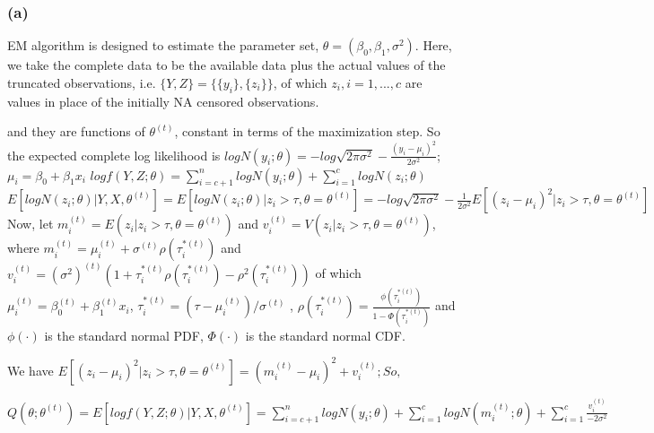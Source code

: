 \documentclass{article}\usepackage{graphicx, color}
\begin{document}
\subsubsection*{(a)}
\hspace{12 pt} EM algorithm is designed to estimate the parameter set, $\theta = (\beta_0,\beta_1,\sigma^2)$. Here, we take the complete data to be
the available data plus the actual values of the truncated observations, i.e. $\{Y, Z\}=\{\{y_i\},\{z_i\}\}$, 
of which $z_i, i=1, ... , c$ are values in place of the initially NA censored observations. 

and they are functions of $\theta^{(t)}$, constant in terms of the maximization step.  
So the expected complete log likelihood is \newline
$logN(y_i;\theta) = \displaystyle -log\sqrt{2\pi\sigma^2} - \frac{(y_i-\mu_i)^2}{2\sigma^2}$; $\mu_i = \beta_0 + \beta_1x_i$ \newline
$logf(Y,Z;\theta) = \displaystyle \sum_{i=c+1}^n logN(y_i;\theta) + \sum_{i=1}^c logN(z_i;\theta) $ \newline
$E[logN(z_i;\theta) | Y,X,\theta^{(t)}] = E[logN(z_i;\theta) | z_i>\tau,\theta = \theta^{(t)}] 
                        = \displaystyle -log\sqrt{2\pi\sigma^2}-\frac{1}{2\sigma^2}E[(z_i-\mu_i)^2  | z_i>\tau,\theta = \theta^{(t)}]$\newline
Now, let $\displaystyle m_i^{(t)}=E(z_i|z_i>\tau,\theta = \theta^{(t)})$ and $\displaystyle v_i^{(t)}=V(z_i|z_i>\tau,\theta = \theta^{(t)})$, \newline
where $\displaystyle m_i^{(t)} = \mu_i^{(t)} + \sigma^{(t)}\rho(\tau_i^{*(t)})$ 
and $\displaystyle v_i^{(t)} = (\sigma^2)^{(t)}(1 + \tau_i^{*(t)}\rho(\tau_i^{*(t)}) - \rho^2(\tau_i^{*(t)}))$ \newline
of which $\displaystyle \mu_i^{(t)} = \beta_0^{(t)} + \beta_1^{(t)}x_i$, $\displaystyle \tau_i^{*(t)} = (\tau - \mu_i^{(t)})/\sigma^{(t)}$ ,\newline
$\displaystyle \rho(\tau_i^{*(t)}) = \frac{\phi(\tau_i^{*(t)})}{1 - \Phi(\tau_i^{*(t)})}$ 
and $\phi(\cdot)$ is the standard normal PDF, $\Phi(\cdot)$ is the standard normal CDF.\newline 

We have $E[(z_i-\mu_i)^2 | z_i>\tau,\theta = \theta^{(t)}] = (m_i^{(t)}-\mu_i)^2+v_i^{(t)}; So,$\newline

$Q(\theta;\theta^{(t)}) = \displaystyle E[logf(Y,Z;\theta)|Y,X,\theta^{(t)}]
                        = \sum_{i=c+1}^n logN(y_i;\theta) +
                          \sum_{i=1}^c logN(m_i^{(t)};\theta) +
                          \sum_{i=1}^c \frac{v_i^{(t)}}{-2\sigma^2}$ \newline
\end{document}
